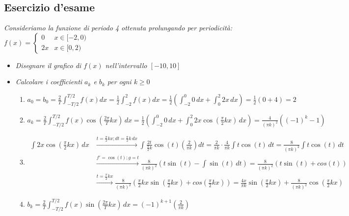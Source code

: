 \documentclass[10pt, a4paper]{article}
\begin{document}
    \subsection{Esercizio d'esame}
    \textit{Consideriamo la funzione di periodo 4 ottenuta prolungando per periodicità:} $\displaystyle f(x)=\begin{cases}
        0 & x\in[-2,0)\\
        2x & x\in[0,2)
    \end{cases}$
    \begin{itemize}
        \item \textit{Disegnare il grafico di $f(x)$ nell'intervallo $[-10,10]$}
        \item \textit{Calcolare i coefficienti $a_k$ e $b_k$ per ogni $k\geq 0$} \begin{enumerate}
            \item $\displaystyle a_0=b_0=\frac{2}{T}\int_{-T/2}^{T/2}f(x)dx=\frac{1}{2}\int_{-2}^{2}f(x)dx=\frac{1}{2}\left(\int_{-2}^{0} 0\,dx+\int_{0}^{2}2x \,dx\right)=\frac{1}{2}(0+4)=2$
            \item $\displaystyle a_k=\frac{2}{T}\int_{-T/2}^{T/2}f(x)\cos\left(\frac{2\pi}{T}kx\right)\,dx=\frac{1}{2}\left(\int_{-2}^{0} 0\,dx+\int_{0}^{2}2x\cos\left(\frac{\pi}{2}kx\right) \,dx\right)=\frac{4}{(\pi k)^2}((-1)^k-1)$
            \item \begin{equation*}
                \begin{split}
                    \displaystyle \int 2x\cos\left(\frac{\pi}{2}kx\right) \,dx &\xrightarrow{t=\frac{\pi}{2}kx;dt=\frac{\pi}{2}k\,dx}\int \frac{2t}{\frac{\pi}{2}k}\cos\left(t\right) \left(\frac{2}{\pi k}\right)dt=\frac{2}{\pi k}\cdot\frac{4}{\pi k}\int t\cos\left(t\right) \,dt=\frac{8}{(\pi k)^2}\int t\cos\left(t\right) \,dt\\
                    &\xrightarrow{f'=\cos(t); g=t} \frac{8}{(\pi k)^2}\left(t\sin(t)-\int \sin(t)\,dt\right) = \frac{8}{(\pi k)^2}\left(t\sin(t)+cos(t)\right)\\
                    &\xrightarrow{t=\frac{\pi}{2}kx}\frac{8}{(\pi k)^2}\left(\frac{\pi}{2}kx \sin\left(\frac{\pi}{2}kx\right)+cos\left(\frac{\pi}{2}kx\right)\right) = \frac{4x}{\pi k}\sin\left(\frac{\pi}{2}kx\right)+\frac{8}{(\pi k)^2}\cos\left(\frac{\pi}{2}kx\right)
                \end{split}
            \end{equation*}
            \item $\displaystyle b_k = \frac{2}{T}\int_{-T/2}^{T/2}f(x)\sin\left(\frac{2\pi}{T}kx\right)\,dx=(-1)^{k+1}\left(\frac{2}{\pi k}\right)$

\end{enumerate}
\end{itemize}
\end{document}
